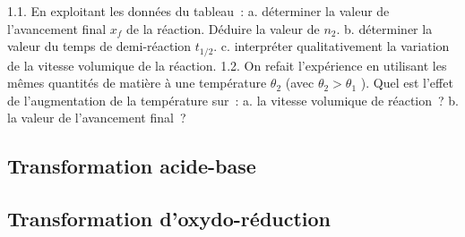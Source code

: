 1.1. En exploitant les données du tableau~:
a. déterminer la valeur de l'avancement final $x_{f}$ de la réaction. Déduire la valeur de $n_{2}$.
b. déterminer la valeur du temps de demi-réaction $t_{1 / 2}$.
c. interpréter qualitativement la variation de la vitesse volumique de la réaction.
1.2. On refait l'expérience en utilisant les mêmes quantités de matière à une température $\theta_{2}$ (avec $\theta_{2}>\theta_{1}$ ).
Quel est l'effet de l'augmentation de la température sur~:
a. la vitesse volumique de réaction~?
b. la valeur de l'avancement final~?

\subsection{Transformation acide-base}


\subsection{Transformation d'oxydo-réduction}

